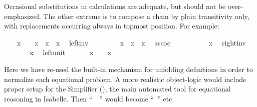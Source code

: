 \begin{isabellebody}
\begin{isamarkuptext}
  Occasional substitutions in calculations are adequate, but should
  not be over-emphasized.  The other extreme is to compose a chain by
  plain transitivity only, with replacements occurring always in
  topmost position. For example:%
\end{isamarkuptext}%
\isamarkuptrue%
%
\isadelimproof
%
\endisadelimproof
%
\isatagproof
\ \ \isamarkupfalse%
\ {\isachardoublequoteopen}x\ {\isasymcirc}\ {}\ {\isacharequal}\ x\ {\isasymcirc}\ {\isacharparenleft}x{\isasyminverse}\ {\isasymcirc}\ x{\isacharparenright}{\isachardoublequoteclose}\ \isamarkupfalse%
\ left{\isacharunderscore}inv\ \isacommand{{\isachardot}{\isachardot}}\isamarkupfalse%
\isanewline
\ \ \isamarkupfalse%
\ \isamarkupfalse%
\ {\isachardoublequoteopen}{\isasymdots}\ {\isacharequal}\ {\isacharparenleft}x\ {\isasymcirc}\ x{\isasyminverse}{\isacharparenright}\ {\isasymcirc}\ x{\isachardoublequoteclose}\ \isamarkupfalse%
\ assoc\ \isacommand{{\isachardot}{\isachardot}}\isamarkupfalse%
\isanewline
\ \ \isamarkupfalse%
\ \isamarkupfalse%
\ {\isachardoublequoteopen}{\isasymdots}\ {\isacharequal}\ {}\ {\isasymcirc}\ x{\isachardoublequoteclose}\ \isamarkupfalse%
\ right{\isacharunderscore}inv\ \isacommand{{\isachardot}{\isachardot}}\isamarkupfalse%
\isanewline
\ \ \isamarkupfalse%
\ \isamarkupfalse%
\ {\isachardoublequoteopen}{\isasymdots}\ {\isacharequal}\ x{\isachardoublequoteclose}\ \isamarkupfalse%
\ left{\isacharunderscore}unit\ \isacommand{{\isachardot}{\isachardot}}\isamarkupfalse%
\isanewline
\ \ \isamarkupfalse%
\ \isamarkupfalse%
\ {\isachardoublequoteopen}x\ {\isasymcirc}\ {}\ {\isacharequal}\ x{\isachardoublequoteclose}\ \isacommand{{\isachardot}}\isamarkupfalse%
%
\endisatagproof
{\isafoldproof}%
%
\isadelimproof
%
\endisadelimproof
%
\begin{isamarkuptext}%
\noindent Here we have re-used the built-in mechanism for unfolding
  definitions in order to normalize each equational problem.  A more
  realistic object-logic would include proper setup for the Simplifier
  (), the main automated tool for equational
  reasoning in Isabelle.  Then ``\hyperlink{command.unfolding}{\mbox{}}~~\hyperlink{command.ddot}{\mbox{\isa{\isacommand{{\isachardot}{\isachardot}}}}}'' would become ``\hyperlink{command.by}{\mbox{}}~'' etc.%

\end{isamarkuptext}
\end{isabellebody}
